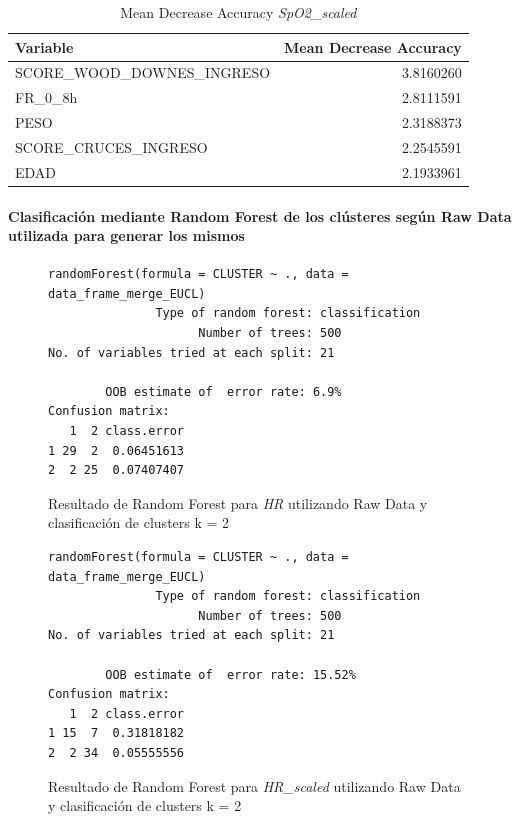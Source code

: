 \begin{table}[H]
    \centering
    \begin{tabular}{lr}
        \toprule
        \textbf{Variable} & \textbf{Mean Decrease Accuracy} \\
        \midrule
        SCORE\_WOOD\_DOWNES\_INGRESO & 3.8160260 \\
        FR\_0\_8h & 2.8111591 \\
        PESO & 2.3188373 \\
        SCORE\_CRUCES\_INGRESO & 2.2545591 \\
        EDAD & 2.1933961 \\
        \bottomrule
    \end{tabular}
    \caption{Mean Decrease Accuracy \textit{SpO2\_scaled}}
\end{table}


\paragraph{Clasificación mediante Random Forest de los clústeres según Raw Data utilizada para generar los mismos} 

\begin{figure}[H]
    \centering
    \begin{lstlisting}[frame=single, basicstyle=\small\ttfamily]
        randomForest(formula = CLUSTER ~ ., data = data_frame_merge_EUCL) 
               Type of random forest: classification
                     Number of trees: 500
No. of variables tried at each split: 21

        OOB estimate of  error rate: 6.9%
Confusion matrix:
   1  2 class.error
1 29  2  0.06451613
2  2 25  0.07407407
    \end{lstlisting}
    \caption{Resultado de Random Forest para \textit{HR} utilizando Raw Data y clasificación de clusters k = 2}\label{fig:random_forest_eucl_result_RF_1}
\end{figure}
\begin{figure}[H]
    \centering
    \begin{lstlisting}[frame=single, basicstyle=\small\ttfamily]
        randomForest(formula = CLUSTER ~ ., data = data_frame_merge_EUCL) 
               Type of random forest: classification
                     Number of trees: 500
No. of variables tried at each split: 21

        OOB estimate of  error rate: 15.52%
Confusion matrix:
   1  2 class.error
1 15  7  0.31818182
2  2 34  0.05555556
    \end{lstlisting}
    \caption{Resultado de Random Forest para \textit{HR\_scaled} utilizando Raw Data y clasificación de clusters k = 2}
    \label{fig:random_forest_eucl_result_RF_2}
\end{figure}


